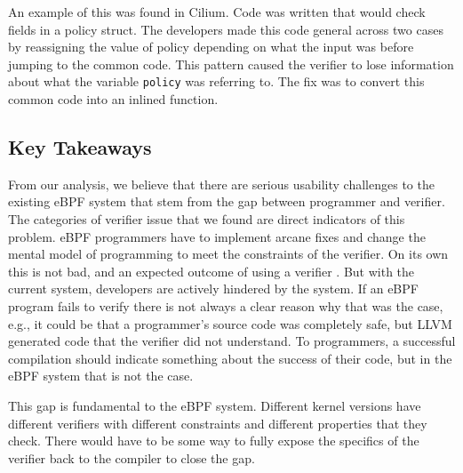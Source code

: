 An example of this was found in Cilium.
Code was written that would check fields in a policy struct.
The developers made this code general across two cases by reassigning the value of policy depending on what the input was before jumping to the common code.
This pattern caused the verifier to lose information about what the variable \verb{policy{ was referring to.
The fix was to convert this common code into an inlined function.

\subsection{Key Takeaways}
From our analysis, we believe that there are serious usability challenges to the existing eBPF system that stem from the gap between programmer and verifier.
The categories of verifier issue that we found are direct indicators of this problem.
eBPF programmers have to implement arcane fixes and change the mental model of programming to meet the constraints of the verifier.
On its own this is not bad, and an expected outcome of using a verifier
.
But with the current system, developers are actively hindered by the system.
If an eBPF program fails to verify there is not always a clear reason why that was the case, e.g.,
it could be that a programmer's source code was completely safe, but LLVM generated code that the verifier did not understand.
To programmers, a successful compilation should indicate something about the success of their code, but in the eBPF system that is not the case.

This gap is fundamental to the eBPF system.
Different kernel versions have different verifiers with different constraints and different properties that they check.
There would have to be some way to fully expose the specifics of the verifier back to the compiler to close the gap.
